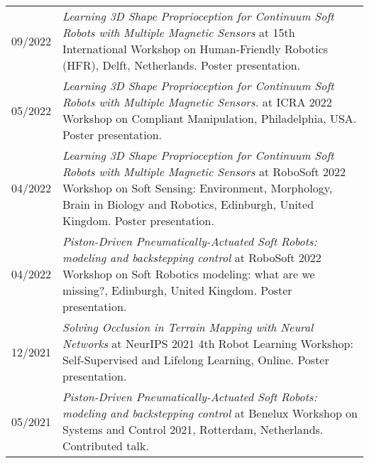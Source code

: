 \begin{longtable}{p{} p{}}
    09/2022 & \emph{Learning 3D Shape Proprioception for Continuum Soft Robots with Multiple Magnetic Sensors} at 15th International Workshop on Human-Friendly Robotics (HFR), Delft, Netherlands. Poster presentation.\\
    05/2022 & \emph{Learning 3D Shape Proprioception for Continuum Soft Robots with Multiple Magnetic Sensors.} at ICRA 2022 Workshop on Compliant Manipulation, Philadelphia, USA. Poster presentation.\\
    04/2022 & \emph{Learning 3D Shape Proprioception for Continuum Soft Robots with Multiple Magnetic Sensors} at RoboSoft 2022 Workshop on Soft Sensing: Environment, Morphology, Brain in Biology and Robotics, Edinburgh, United Kingdom. Poster presentation.\\
    04/2022 & \emph{Piston-Driven Pneumatically-Actuated Soft Robots: modeling and backstepping control} at RoboSoft 2022 Workshop on Soft Robotics modeling: what are we missing?, Edinburgh, United Kingdom. Poster presentation.\\
    12/2021 & \emph{Solving Occlusion in Terrain Mapping with Neural Networks} at NeurIPS 2021 4th Robot Learning Workshop: Self-Supervised and Lifelong Learning, Online. Poster presentation.\\
    05/2021 & \emph{Piston-Driven Pneumatically-Actuated Soft Robots: modeling and backstepping control} at Benelux Workshop on Systems and Control 2021, Rotterdam, Netherlands. Contributed talk.\\
\end{longtable}